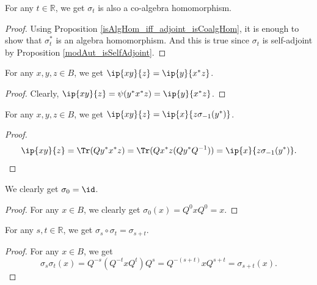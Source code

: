  \begin{corollary}\label{modAut_isCoalgHom}
  \leanok
  For any $t\in\mathbb{R}$, we get $\sigma_t$ is also a co-algebra homomorphism.
 \end{corollary}
 \begin{proof}
  \leanok
  Using Proposition \ref{isAlgHom_iff_adjoint_isCoalgHom}, it is enough to show that $\sigma_t^*$ is an algebra homomorphism. And this is true since $\sigma_t$ is self-adjoint by Proposition \ref{modAut_isSelfAdjoint}.
 \end{proof}
 
 \begin{lemma}\label{inner_star_left}
  \leanok
  For any $x,y,z\in{B}$, we get $\ip{xy}{z}=\ip{y}{x^*z}$.
 \end{lemma}
 \begin{proof}\leanok
  Clearly, $\ip{xy}{z}=\psi(y^*x^*z)=\ip{y}{x^*z}$.
 \end{proof}

 \begin{lemma}\label{inner_conj_left}
  \leanok
  For any $x,y,z\in{B}$, we get $\ip{xy}{z}=\ip{x}{z\sigma_{-1}(y^*)}$.
 \end{lemma}
 \begin{proof}\leanok
  \[\ip{xy}{z}=\Tr(Q{y^*x^*}z)=\Tr(Qx^*z(Qy^*Q^{-1}))=\ip{x}{z\sigma_{-1}(y^*)}.\]
 \end{proof}

 \begin{lemma}\label{modAut_zero}
  \leanok
  We clearly get $\sigma_0=\id$.
 \end{lemma}
 \begin{proof}\leanok
  For any $x\in{B}$, we clearly get $\sigma_0(x)=Q^0xQ^0=x$.
 \end{proof}

 \begin{lemma}\label{modAut_comp}
  \leanok
  For any $s,t\in\mathbb{R}$, we get $\sigma_s\circ\sigma_t=\sigma_{s+t}$.
 \end{lemma}
 \begin{proof}\leanok
  For any $x\in{B}$, we get
  \[\sigma_s\sigma_t(x)=Q^{-s}(Q^{-t}xQ^t)Q^s=Q^{-(s+t)}xQ^{s+t}=\sigma_{s+t}(x).\]
 \end{proof}
 
